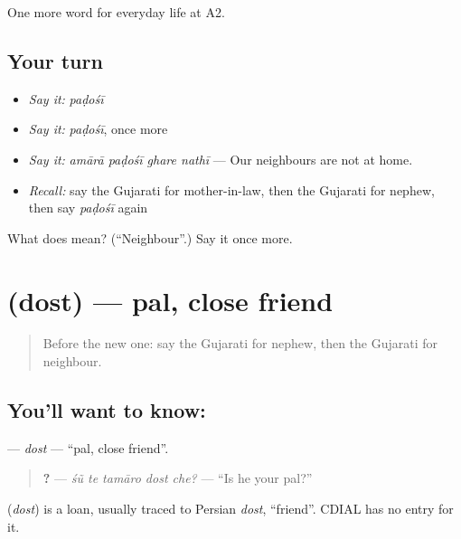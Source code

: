 \begin{grammarlens}[title={What you've built}]
One more word for everyday life at A2.
\end{grammarlens}

\subsection*{Your turn}
\begin{itemize}
\raggedright
  \item \emph{Say it:} \emph{paḍośī}
  \item \emph{Say it:} \emph{paḍośī}, once more
  \item \emph{Say it:} \emph{amārā paḍośī ghare nathī} — Our neighbours are not at home.
  \item \emph{Recall:} say the Gujarati for mother-in-law, then the Gujarati for nephew, then say \emph{paḍośī} again
\end{itemize}

\begin{tcolorbox}[breakable,colback=teal!4,colframe=teal!35!black,title={Before you move on}]
What does  mean? (\textquotedblleft{}Neighbour\textquotedblright{}.) Say it once more.
\end{tcolorbox}
\section[\texorpdfstring{\gu{દોસ્ત} (dost)}{દોસ્ત (dost)}]{ (dost) — pal, close friend}

\label{lesson:GU-C264-dost}



\begin{quote}
Before the new one: say the Gujarati for nephew, then the Gujarati for neighbour.
\end{quote}

\subsection*{You'll want to know: }
\textbf{} — \emph{dost} — \textquotedblleft{}pal, close friend\textquotedblright{}.

\begin{quote}
\textbf{    ?} — \emph{śũ te tamāro dost che?} — \textquotedblleft{}Is he your pal?\textquotedblright{}
\end{quote}

\begin{cousinweb}
\textbf{} (\emph{dost}) is a loan, usually traced to Persian \emph{dost}, \textquotedblleft{}friend\textquotedblright{}. CDIAL has no entry for it.
\end{cousinweb}

